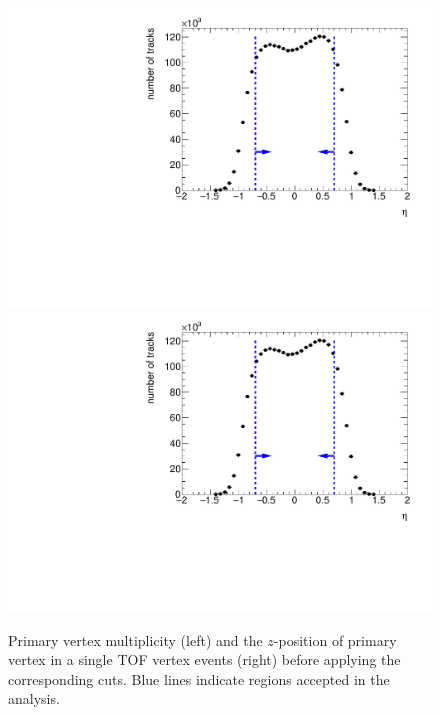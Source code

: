 \begin{figure}[h!]
	\centering
	\includegraphics[width=.49\textwidth, page=10]{chapters/chrgSTAR/img/selection/SDT.pdf}
	\includegraphics[width=.49\textwidth, page=5]{chapters/chrgSTAR/img/selection/SDT.pdf}
	\caption[Primary vertex multiplicity and the $z$-position of primary vertex in a single TOF vertex events  before applying  the corresponding cuts]{Primary vertex multiplicity (left) and the $z$-position of primary vertex in a single TOF vertex events (right) before applying  the corresponding cuts. Blue lines indicate regions accepted in the analysis.}
	\label{fig:vertexSTAR}
\end{figure}

\FloatBarrier